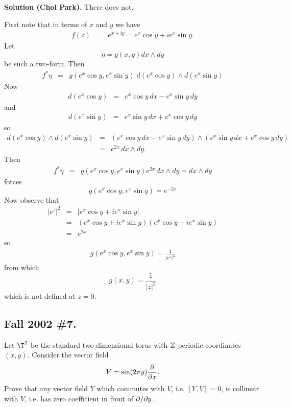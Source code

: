 \documentclass[10pt]{article}
\numberwithin{equation}{subsection}
\begin{document}
\textbf{Solution (Chol Park).}  There does not.

First note that in terms of $x$ and $y$ we have
\begin{eqnarray*}
	f(z) &=& e^{x+iy} = e^x\cos y + ie^x\sin y.
\end{eqnarray*}
Let
$$
	\eta = g(x,y)dx\wedge dy
$$
be such a two-form.  Then
\begin{eqnarray*}
	f^*\eta &=& g (e^x\cos y, e^x\sin y) \; d(e^x\cos y)\wedge d(e^x\sin y)
\end{eqnarray*}
Now
\begin{eqnarray*}
	d(e^x\cos y) &=& e^x\cos y\,dx - e^x\sin y\,dy
\end{eqnarray*}
and
\begin{eqnarray*}
	d(e^x\sin y) &=& e^x\sin y\,dx + e^x\cos y\,dy
\end{eqnarray*}
so
\begin{eqnarray*}
	d(e^x\cos y) \wedge d(e^x\sin y)
	&=& \left(e^x\cos y\,dx - e^x\sin y\,dy\right)
		\wedge \left(e^x\sin y\,dx + e^x\cos y\,dy\right) \\
	&=& e^{2x}\,dx\wedge dy.
\end{eqnarray*}
Then
\begin{eqnarray*}
	f^*\eta &=& g (e^x\cos y, e^x\sin y) e^{2x}\,dx\wedge dy = dx\wedge dy
\end{eqnarray*}
forces
$$
	g (e^x\cos y, e^x\sin y) = e^{-2x}
$$
Now observe that
\begin{eqnarray*}
	|e^z|^2 &=& |e^x \cos y + i e^x \sin y| \\
	&=& (e^x \cos y + i e^x \sin y) (e^x \cos y - i e^x \sin y) \\
	&=& e^{2x}
\end{eqnarray*}
so
\begin{eqnarray*}
	g (e^x\cos y, e^x\sin y) = \frac{1}{|e^z|^2}
\end{eqnarray*}
from which
$$
	g(x,y) = \frac{1}{|z|^2}
$$
which is not defined at $z=0$.

\subsection{Fall 2002 \#7.}

Let $\T^2$ be the standard two-dimensional torus with $\mathbb{Z}$-periodic
coordinates $(x,y)$.  Consider the vector field
$$
	V = \sin(2\pi y)\frac{\partial}{\partial x}.
$$
Prove that any vector field $Y$ which commutes with $V$, i.e. $[Y,V]=0$,
is collinear with $V$, i.e. has zero coefficient in front of $\partial/\partial y$.
\end{document}
